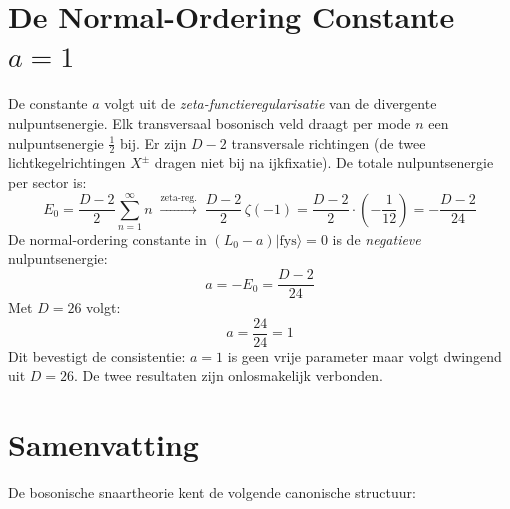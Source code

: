 \documentclass[12pt,a4paper]{article}
\begin{document}
    \section{De Normal-Ordering Constante $a=1$}

        De constante $a$ volgt uit de \emph{zeta-functieregularisatie} van de divergente nulpuntsenergie. Elk transversaal bosonisch veld draagt per mode $n$ een nulpuntsenergie $\tfrac{1}{2}$ bij. Er zijn $D-2$ transversale richtingen (de twee lichtkegelrichtingen $X^\pm$ dragen niet bij na ijkfixatie). De totale nulpuntsenergie per sector is:
        \begin{equation}
            E_0 = \frac{D-2}{2}\sum_{n=1}^\infty n \;\xrightarrow{\text{zeta-reg.}}\; \frac{D-2}{2}\,\zeta(-1) = \frac{D-2}{2}\cdot\left(-\frac{1}{12}\right) = -\frac{D-2}{24}
        \end{equation}
        De normal-ordering constante in $(L_0 - a)|\mathrm{fys}\rangle = 0$ is de \emph{negatieve} nulpuntsenergie:
        \begin{equation}
            a = -E_0 = \frac{D-2}{24}
        \end{equation}
        Met $D = 26$ volgt:
        \begin{equation}
            a = \frac{24}{24} = 1
        \end{equation}
        Dit bevestigt de consistentie: $a=1$ is geen vrije parameter maar volgt dwingend uit $D=26$. De twee resultaten zijn onlosmakelijk verbonden.

    \section{Samenvatting}

        De bosonische snaartheorie kent de volgende canonische structuur:
\end{document}
